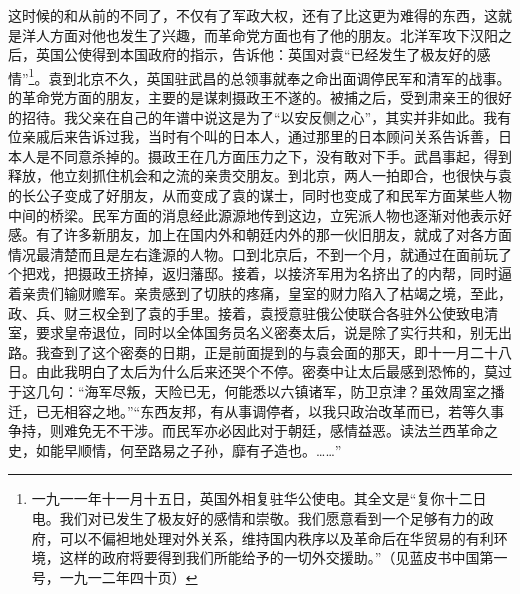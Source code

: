 这时候的和从前的不同了，不仅有了军政大权，还有了比这更为难得的东西，这就是洋人方面对他也发生了兴趣，而革命党方面也有了他的朋友。北洋军攻下汉阳之后，英国公使得到本国政府的指示，告诉他：英国对袁“已经发生了极友好的感情”\footnote{一九一一年十一月十五日，英国外相复驻华公使电。其全文是“复你十二日电。我们对已发生了极友好的感情和崇敬。我们愿意看到一个足够有力的政府，可以不偏袒地处理对外关系，维持国内秩序以及革命后在华贸易的有利环境，这样的政府将要得到我们所能给予的一切外交援助。”（见蓝皮书中国第一号，一九一二年四十页）}。袁到北京不久，英国驻武昌的总领事就奉之命出面调停民军和清军的战事。的革命党方面的朋友，主要的是谋刺摄政王不遂的。被捕之后，受到肃亲王的很好的招待。我父亲在自己的年谱中说这是为了“以安反侧之心”，其实并非如此。我有位亲戚后来告诉过我，当时有个叫的日本人，通过那里的日本顾问关系告诉善，日本人是不同意杀掉的。摄政王在几方面压力之下，没有敢对下手。武昌事起，得到释放，他立刻抓住机会和之流的亲贵交朋友。到北京，两人一拍即合，也很快与袁的长公子变成了好朋友，从而变成了袁的谋士，同时也变成了和民军方面某些人物中间的桥梁。民军方面的消息经此源源地传到这边，立宪派人物也逐渐对他表示好感。有了许多新朋友，加上在国内外和朝廷内外的那一伙旧朋友，就成了对各方面情况最清楚而且是左右逢源的人物。口到北京后，不到一个月，就通过在面前玩了个把戏，把摄政王挤掉，返归藩邸。接着，以接济军用为名挤出了的内帮，同时逼着亲贵们输财赡军。亲贵感到了切肤的疼痛，皇室的财力陷入了枯竭之境，至此，政、兵、财三权全到了袁的手里。接着，袁授意驻俄公使联合各驻外公使致电清室，要求皇帝退位，同时以全体国务员名义密奏太后，说是除了实行共和，别无出路。我查到了这个密奏的日期，正是前面提到的与袁会面的那天，即十一月二十八日。由此我明白了太后为什么后来还哭个不停。密奏中让太后最感到恐怖的，莫过于这几句：“海军尽叛，天险已无，何能悉以六镇诸军，防卫京津？虽效周室之播迁，已无相容之地。”“东西友邦，有从事调停者，以我只政治改革而已，若等久事争持，则难免无不干涉。而民军亦必因此对于朝廷，感情益恶。读法兰西革命之史，如能早顺情，何至路易之子孙，靡有孑造也。……”\\

